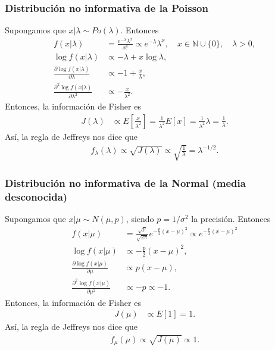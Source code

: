 \subsubsection{Distribución no informativa de la Poisson}
\noindent Supongamos que $x | \lambda \sim Po(\lambda)$. Entonces 
\begin{align*}
    f(x | \lambda) &= \frac{e^{-\lambda}\lambda^x}{x!} \propto e^{-\lambda}\lambda^x, \quad x \in \mathbb{N} \cup \{0\}, \quad\lambda >0,  \\
     \log f(x | \lambda) & \propto -\lambda + x \log \lambda , \\
     \frac{\partial \log f(x | \lambda)}{\partial \lambda} & \propto - 1 + \frac{x}{\lambda},  \\
     \frac{\partial^2 \log f(x | \lambda)}{\partial \lambda^2} & \propto - \frac{x}{\lambda^2} .
\end{align*}
Entonces, la información de Fisher es
\begin{align*}
    J(\lambda) & \propto E\left[ \frac{x}{\lambda^2} \right] = \frac{1}{\lambda^2}E[x] = \frac{1}{\lambda^2} \lambda = \frac{1}{\lambda}.
\end{align*}
Así, la regla de Jeffreys nos dice que
\begin{align*}
    f_{\lambda}(\lambda) \propto \sqrt{J(\lambda)} \propto \sqrt{\frac{1}{\lambda}} = \lambda^{-1/2}. 
\end{align*}

\subsubsection{Distribución no informativa de la Normal (media desconocida)}
\noindent Supongamos que $x | \mu \sim N(\mu,p)$, siendo $p = 1/\sigma^2$ la precisión. Entonces 
\begin{align*}
    f(x | \mu) &= \frac{\sqrt{p}}{\sqrt{2\pi}}e^{-\frac{p}{2}(x-\mu)^2} \propto e^{-\frac{p}{2}(x-\mu)^2}  \\
     \log f(x | \mu) & \propto -\frac{p}{2}(x-\mu)^2  , \\
     \frac{\partial \log f(x | \mu)}{\partial \mu} & \propto p(x-\mu),  \\
     \frac{\partial^2 \log f(x | \mu)}{\partial \mu^2} & \propto -p \propto -1 .
\end{align*}
Entonces, la información de Fisher es
\begin{align*}
    J(\mu) & \propto E\left[ 1 \right] = 1.
\end{align*}
Así, la regla de Jeffreys nos dice que
\begin{align*}
    f_{\mu}(\mu) \propto \sqrt{J(\mu)} \propto 1.
\end{align*}

